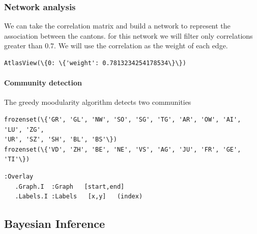 \documentclass[11pt]{article}
\begin{document}
    \hypertarget{network-analysis}{%
\subsubsection{Network analysis}\label{network-analysis}}

We can take the correlation matrix and build a network to represent the
association between the cantons. for this network we will filter only
correlations greater than \(0.7\). We will use the correlation as the
weight of each edge.

    
    
    
    
    
    
            \begin{tcolorbox}[breakable, size=fbox, boxrule=.5pt, pad at break*=1mm, opacityfill=0]
\begin{Verbatim}[commandchars=\\\{\}]
AtlasView(\{0: \{'weight': 0.7813234254178534\}\})
\end{Verbatim}
\end{tcolorbox}
        
    \hypertarget{community-detection}{%
\paragraph{Community detection}\label{community-detection}}

The greedy moodularity algorithm detects two communities

    \begin{Verbatim}[commandchars=\\\{\}]
frozenset(\{'GR', 'GL', 'NW', 'SO', 'SG', 'TG', 'AR', 'OW', 'AI', 'LU', 'ZG',
'UR', 'SZ', 'SH', 'BL', 'BS'\})
frozenset(\{'VD', 'ZH', 'BE', 'NE', 'VS', 'AG', 'JU', 'FR', 'GE', 'TI'\})
    \end{Verbatim}

    
    
            \begin{tcolorbox}[breakable, size=fbox, boxrule=.5pt, pad at break*=1mm, opacityfill=0]
\begin{Verbatim}[commandchars=\\\{\}]
:Overlay
   .Graph.I  :Graph   [start,end]
   .Labels.I :Labels   [x,y]   (index)
\end{Verbatim}
\end{tcolorbox}
        
    \hypertarget{bayesian-inference}{%
\subsection{Bayesian Inference}\label{bayesian-inference}}
\end{document}
